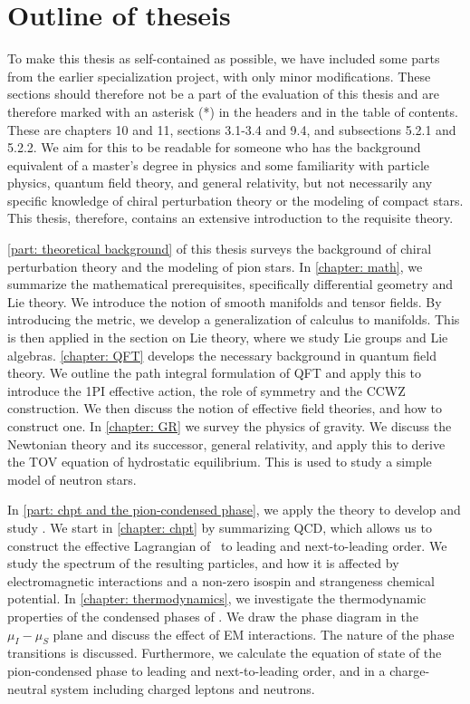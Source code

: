 \section{Outline of theseis}

To make this thesis as self-contained as possible, we have included some parts from the earlier specialization project, with only minor modifications.
These sections should therefore not be a part of the evaluation of this thesis and are therefore marked with an asterisk (*) in the headers and in the table of contents.
These are chapters 10 and 11, sections 3.1-3.4 and 9.4, and subsections 5.2.1 and 5.2.2.
We aim for this to be readable for someone who has the background equivalent of a master's degree in physics and some familiarity with particle physics, quantum field theory, and general relativity, but not necessarily any specific knowledge of chiral perturbation theory or the modeling of compact stars.
This thesis, therefore, contains an extensive introduction to the requisite theory.

\autoref{part: theoretical background} of this thesis surveys the background of chiral perturbation theory and the modeling of pion stars.
In \autoref{chapter: math}, we summarize the mathematical prerequisites, specifically differential geometry and Lie theory.
We introduce the notion of smooth manifolds and tensor fields.
By introducing the metric, we develop a generalization of calculus to manifolds.
This is then applied in the section on Lie theory, where we study Lie groups and Lie algebras.
\autoref{chapter: QFT} develops the necessary background in quantum field theory.
We outline the path integral formulation of QFT and apply this to introduce the 1PI effective action, the role of symmetry and the CCWZ construction.
We then discuss the notion of effective field theories, and how to construct one.
In \autoref{chapter: GR} we survey the physics of gravity.
We discuss the Newtonian theory and its successor, general relativity, and apply this to derive the TOV equation of hydrostatic equilibrium.
This is used to study a simple model of neutron stars.

In \autoref{part: chpt and the pion-condensed phase}, we apply the theory to develop and study \chpt.
We start in \autoref{chapter: chpt} by summarizing QCD, which allows us to construct the effective Lagrangian of \chpt\, to leading and next-to-leading order.
We study the spectrum of the resulting particles, and how it is affected by electromagnetic interactions and a non-zero isospin and strangeness chemical potential.
In \autoref{chapter: thermodynamics}, we investigate the thermodynamic properties of the condensed phases of \chpt.
We draw the phase diagram in the $\mu_I-\mu_S$ plane and discuss the effect of EM interactions.
The nature of the phase transitions is discussed.
Furthermore, we calculate the equation of state of the pion-condensed phase to leading and next-to-leading order, and in a charge-neutral system including charged leptons and neutrons.

